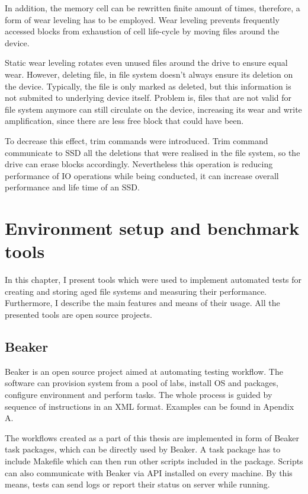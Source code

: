 \documentclass[
  color, %
  table, %
  lof,   %
  lot,   %
]{fithesis3}
\begin{document}
In addition, the memory cell can be rewritten finite amount of times, therefore, a form of wear leveling has to be employed. Wear leveling prevents frequently accessed blocks from exhaustion of cell life-cycle by moving files around the device.

Static wear leveling rotates even unused files around the drive to ensure equal wear. However, deleting file, in file system doesn't always ensure its deletion on the device. Typically, the file is only marked as deleted, but this information is not submited to underlying device itself. Problem is, files that are not valid for file system anymore can still circulate on the device, increasing its wear and write amplification, since there are less free block that could have been.

To decrease this effect, trim commands were introduced. Trim command communicate to SSD all the deletions that were realised in the file system, so the drive can erase blocks accordingly. Nevertheless this operation is reducing performance of IO operations while being conducted, it can increase overall performance and life time of an SSD.



\chapter{Environment setup and benchmark tools}
\label{tools}
In this chapter, I present tools which were used to implement automated tests for creating and storing aged file systems and measuring their performance. Furthermore, I describe the main features and means of their usage. All the presented tools are open source projects.

\section{Beaker}
Beaker is an open source project aimed at automating testing workflow. The software can provision system from a pool of labs, install OS and packages, configure environment and perform tasks. The whole process is guided by sequence of instructions in an XML format. Examples can be found in Apendix A.

The workflows created as a part of this thesis are implemented in form of Beaker task packages, which can be directly used by Beaker. A task package has to include Makefile which can then run other scripts included in the package. Scripts can also communicate with Beaker via API installed on every machine.  By this means, tests can send logs or report their status on server while running.
\end{document}
